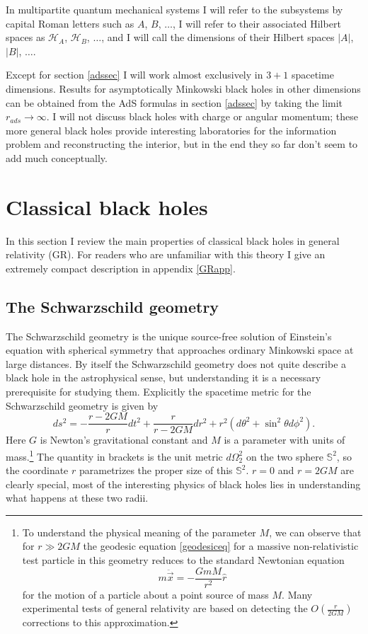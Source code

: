 \documentclass[12pt]{article}
\newcommand{\be}{\begin{equation}}
\newcommand{\ee}{\end{equation}}
\newcommand{\HA}{\mathcal{H}_A}
\newcommand{\HB}{\mathcal{H}_B}
\begin{document}
In multipartite quantum mechanical systems I will refer to the subsystems by capital Roman letters such as $A$, $B$, $\ldots$, I will refer to their associated Hilbert spaces as $\HA$, $\HB$, $\ldots$, and I will call the dimensions of their Hilbert spaces $|A|$, $|B|$, $\ldots$.  

Except for section \ref{adssec} I will work almost exclusively in $3+1$ spacetime dimensions.  Results for asymptotically Minkowski black holes in other dimensions can be obtained from the AdS formulas in section \ref{adssec} by taking the limit $r_{\mathit{ads}}\to\infty$.  I will not discuss black holes with charge or angular momentum; these more general black holes provide interesting laboratories for the information problem and reconstructing the interior, but in the end they so far don't seem to add much conceptually. 

\section{Classical black holes}\label{clbhsec}

In this section I review the main properties of classical black holes in general relativity (GR).  For readers who are unfamiliar with this theory I give an extremely compact description in appendix \ref{GRapp}.
\subsection{The Schwarzschild geometry}\label{schgsec}
The Schwarzschild geometry is the unique source-free solution of Einstein's equation with spherical symmetry that approaches ordinary Minkowski space at large distances.  By itself the Schwarzschild geometry does not quite describe a black hole in the astrophysical sense, but understanding it is a necessary prerequisite for studying them.  Explicitly the spacetime metric for the Schwarzschild geometry is given by
\be\label{schmet}
ds^2=-\frac{r-2GM}{r}dt^2+\frac{r}{r-2GM} dr^2+r^2 (d\theta^2+\sin^2\theta d\phi^2).
\ee
Here $G$ is Newton's gravitational constant and $M$ is a parameter with units of mass.\footnote{To understand the physical meaning of the parameter $M$, we can observe that for $r\gg 2GM$ the geodesic equation \eqref{geodesiceq} for a massive non-relativistic test particle in this geometry reduces to the standard Newtonian equation
\be
m\ddot{\vec{x}}=-\frac{Gm M}{r^2}\hat{r}
\ee
for the motion of a particle about a point source of mass $M$.  Many experimental tests of general relativity are based on detecting the $O\left(\frac{r}{2GM}\right)$ corrections to this approximation.}
The quantity in brackets is the unit metric $d\Omega_2^2$ on the two sphere $\mathbb{S}^2$, so the coordinate $r$ parametrizes the proper size of this $\mathbb{S}^2$.  $r=0$ and $r=2GM$ are clearly special, most of the interesting physics of black holes lies in understanding what happens at these two radii.  
\end{document}
